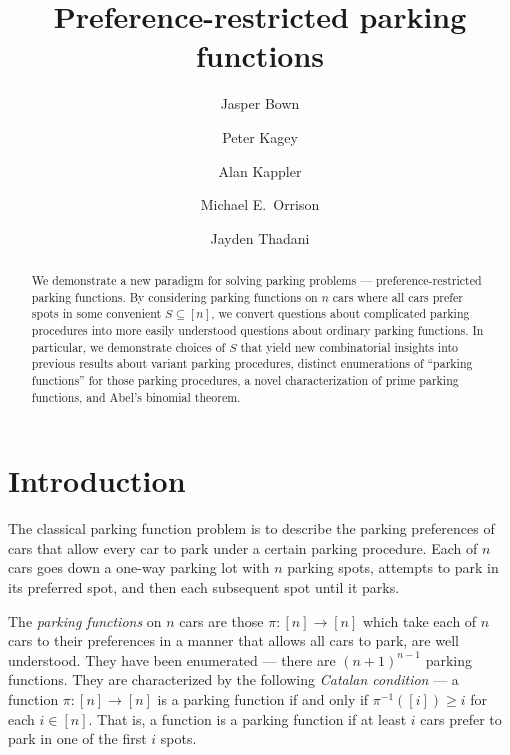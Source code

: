 \documentclass[12 pt]{amsart}
\title{Preference-restricted parking functions}
\author[Bown]{Jasper Bown}
\author[Kagey]{Peter Kagey}
\author[Kappler]{Alan Kappler}
\author[Orrison]{Michael E.~Orrison}
\author[Thadani]{Jayden Thadani}
\theoremstyle{definition} %
\theoremstyle{remark} %
\begin{document}
	

\begin{abstract}
	We demonstrate a new paradigm for solving parking problems --- preference-restricted parking functions. By considering parking functions on $n$ cars where all cars prefer spots in some convenient $S \subseteq [n]$, we convert questions about complicated parking procedures into more easily understood questions about ordinary parking functions. In particular, we demonstrate choices of $S$ that yield new combinatorial insights into previous results about variant parking procedures, distinct enumerations of ``parking functions'' for those parking procedures, a novel characterization of prime parking functions, and Abel's binomial theorem.
\end{abstract}

\maketitle

\pagebreak

\tableofcontents

\pagebreak

\makeatletter
\providecommand\@dotsep{5}
\makeatother
\listoftodos\relax

\pagebreak

\section{Introduction}

The classical parking function problem is to describe the parking preferences of cars that allow every car to park under a certain parking procedure. Each of $n$ cars goes down a one-way parking lot with $n$ parking spots, attempts to park in its preferred spot, and then each subsequent spot until it parks.

The \emph{parking functions} on $n$ cars are those $\pi : [n] \to [n]$ which take each of $n$ cars to their preferences in a manner that allows all cars to park, are well understood. They have been enumerated --- there are $(n + 1)^{n - 1}$ parking functions. They are characterized by the following \emph{Catalan condition} --- a function $\pi : [n] \to [n]$ is a parking function if and only if $\pi^{-1}([i]) \ge i$ for each $i \in [n]$. That is, a function is a parking function if at least $i$ cars prefer to park in one of the first $i$ spots.
\end{document}
